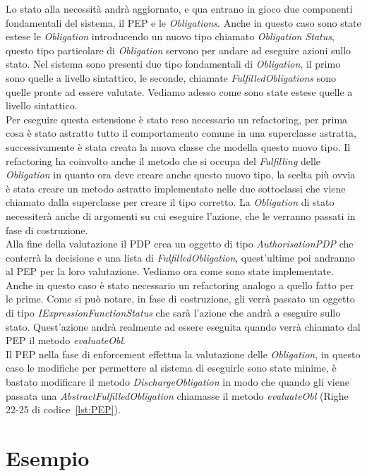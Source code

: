 Lo stato alla necessità andrà aggiornato, e qua entrano in gioco due componenti fondamentali del sistema, il PEP e le \textit{Obligations}. 
Anche in questo caso sono state estese le \textit{Obligation} introducendo un nuovo tipo chiamato \textit{Obligation Status}, questo tipo particolare di \textit{Obligation} servono per andare ad eseguire azioni sullo stato.
Nel sistema sono presenti due tipo fondamentali di \textit{Obligation}, il primo sono quelle a livello sintattico, le seconde, chiamate \textit{FulfilledObligations} sono quelle pronte ad essere valutate. Vediamo adesso come sono state estese quelle a livello sintattico.\\
Per eseguire questa estensione è stato reso necessario un refactoring, per prima cosa è stato astratto tutto il comportamento comune in una superclasse astratta, successivamente è stata creata la nuova classe che modella questo nuovo tipo.
Il refactoring ha coinvolto anche il metodo che si occupa del \textit{Fulfilling} delle \textit{Obligation} in quanto ora deve creare anche questo nuovo tipo, la scelta più ovvia è stata creare un metodo astratto implementato nelle due sottoclassi che viene chiamato dalla superclasse per creare il tipo corretto.
La \textit{Obligation} di stato necessiterà anche di argomenti su cui eseguire l'azione, che le verranno passati in fase di costruzione.\\
Alla fine della valutazione il PDP crea un oggetto di tipo \textit{AuthorisationPDP} che conterrà la decisione e una lista di \textit{FulfilledObligation}, quest'ultime poi andranno al PEP per la loro valutazione. Vediamo ora come sono state implementate.\\
Anche in questo caso è stato necessario un refactoring analogo a quello fatto per le prime.
Come si può notare, in fase di costruzione, gli verrà passato un oggetto di tipo \textit{IExpressionFunctionStatus} che sarà l'azione che andrà a eseguire sullo stato. Quest'azione andrà realmente ad essere eseguita quando verrà chiamato dal PEP il metodo \textit{evaluateObl}.\\
Il PEP nella fase di enforcement effettua la valutazione delle \textit{Obligation}, in questo caso le modifiche per permettere al sistema di eseguirle sono state minime, è bastato modificare il metodo \textit{DischargeObligation} in modo che quando gli viene passata una \textit{AbstractFulfilledObligation} chiamasse il metodo \textit{evaluateObl} (Righe 22-25 di codice~\ref{lst:PEP}).


\section{Esempio} %
\label{sec:esempio}

    

